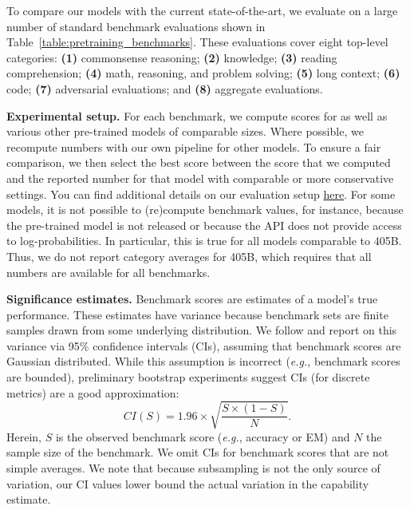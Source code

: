 \documentclass[dvipsnames]{fairmeta}
\begin{document}
To compare our models with the current state-of-the-art, we evaluate \llamathree on a large number of standard benchmark evaluations shown in Table~\ref{table:pretraining_benchmarks}.
These evaluations cover eight top-level categories: \textbf{(1)} commonsense reasoning; \textbf{(2)} knowledge; \textbf{(3)} reading comprehension; \textbf{(4)} math, reasoning, and problem solving; \textbf{(5)} long context; \textbf{(6)} code; \textbf{(7)} adversarial evaluations; and \textbf{(8)} aggregate evaluations.

\textbf{Experimental setup.}
For each benchmark, we compute scores for \llamathree as well as various other pre-trained models of comparable sizes.
Where possible, we recompute numbers with our own pipeline for other models.
To ensure a fair comparison, we then select the best score between the score that we computed and the reported number for that model with comparable or more conservative settings.
You can find additional details on our evaluation setup \href{https://github.com/meta-llama/llama-models/blob/main/models/llama3_1/eval_details.md}{here}.
For some models, it is not possible to (re)compute benchmark values, for instance, because the pre-trained model is not released or because the API does not provide access to log-probabilities. 
In particular, this is true for all models comparable to \llamathree 405B.
Thus, we do not report category averages for \llamathree 405B, which requires that all numbers are available for all benchmarks.

\textbf{Significance estimates.}
Benchmark scores are estimates of a model's true performance.
These estimates have variance because benchmark sets are finite samples drawn from some underlying distribution.
We follow \citet{madaan2024quantifying} and report on this variance via 95\% confidence intervals (CIs), assuming that benchmark scores are Gaussian distributed.
While this assumption is incorrect (\emph{e.g.}, benchmark scores are bounded), preliminary bootstrap experiments suggest CIs (for discrete metrics) are a good approximation:
$$CI(S) = 1.96 \times \sqrt{\frac{S \times (1 - S)}{N}}.$$
Herein, $S$ is the observed benchmark score (\emph{e.g.}, accuracy or EM) and $N$ the sample size of the benchmark.
We omit CIs for benchmark scores that are not simple averages.
We note that because subsampling is not the only source of variation, our CI values lower bound the actual variation in the capability estimate.
\end{document}
